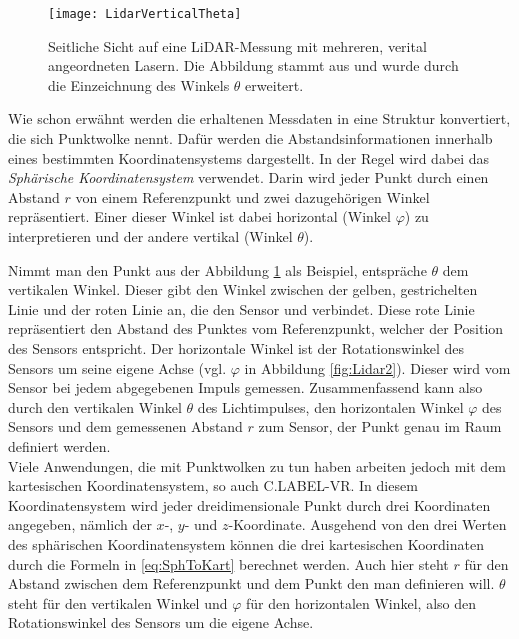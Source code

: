 \begin{figure}%
	\centering
    \texttt{[image: LidarVerticalTheta]}
    \caption{Seitliche Sicht auf eine LiDAR-Messung mit mehreren, verital angeordneten Lasern. Die Abbildung stammt aus \cite{bib:FastGroundSeg} und wurde durch die Einzeichnung des Winkels $\theta$ erweitert.}
    \label{fig:LidarVertical}
\end{figure}

Wie schon erwähnt werden die erhaltenen Messdaten in eine Struktur konvertiert, die sich Punktwolke nennt. Dafür werden die Abstandsinformationen innerhalb eines bestimmten Koordinatensystems dargestellt. In der Regel wird dabei das \textit{Sphärische Koordinatensystem} verwendet. Darin wird jeder Punkt durch einen Abstand $r$ von einem Referenzpunkt und zwei dazugehörigen Winkel repräsentiert. Einer dieser Winkel ist dabei horizontal (Winkel $\varphi$) zu interpretieren und der andere vertikal (Winkel $\theta$). 

Nimmt man den Punkt \grqq{} aus der Abbildung \ref{fig:LidarVertical} als Beispiel, entspräche $\theta$ dem vertikalen Winkel. Dieser gibt den Winkel zwischen der gelben, gestrichelten Linie und der roten Linie an, die den Sensor und \grqq{} verbindet. Diese rote Linie repräsentiert den Abstand des Punktes vom Referenzpunkt, welcher der Position des Sensors entspricht. Der horizontale Winkel ist der Rotationswinkel des Sensors um seine eigene Achse (vgl. $\varphi$ in Abbildung \ref {fig:Lidar2}). Dieser wird vom Sensor bei jedem abgegebenen Impuls gemessen. Zusammenfassend kann also durch den vertikalen Winkel $\theta$ des Lichtimpulses, den horizontalen Winkel $\varphi$ des Sensors und dem gemessenen Abstand $r$ zum Sensor, der Punkt \grqq{} genau im Raum definiert werden.\\

Viele Anwendungen, die mit Punktwolken zu tun haben arbeiten jedoch mit dem kartesischen Koordinatensystem, so auch C.LABEL-VR. In diesem Koordinatensystem wird jeder dreidimensionale Punkt durch drei Koordinaten angegeben, nämlich der $x$-, $y$- und $z$-Koordinate. Ausgehend von den drei Werten des sphärischen Koordinatensystem können die drei kartesischen Koordinaten durch die Formeln in \ref{eq:SphToKart} berechnet werden. Auch hier steht $r$ für den Abstand zwischen dem Referenzpunkt und dem Punkt den man definieren will. $\theta$ steht für den vertikalen Winkel und $\varphi$ für den horizontalen Winkel, also den Rotationswinkel des Sensors um die eigene Achse.


